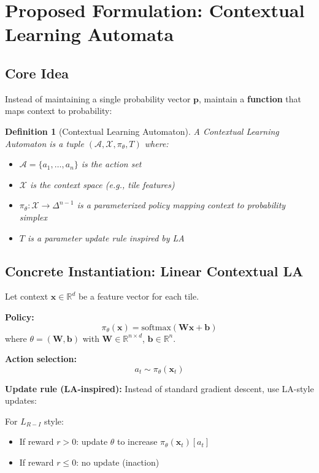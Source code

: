 \documentclass[11pt]{article}
\newtheorem{definition}{Definition}
\begin{document}
\section{Proposed Formulation: Contextual Learning Automata}

\subsection{Core Idea}

Instead of maintaining a single probability vector $\mathbf{p}$, maintain a \textbf{function} that maps context to probability:

\begin{definition}[Contextual Learning Automaton]
A Contextual Learning Automaton is a tuple $(\mathcal{A}, \mathcal{X}, \pi_\theta, T)$ where:
\begin{itemize}
  \item $\mathcal{A} = \{a_1, \ldots, a_n\}$ is the action set
  \item $\mathcal{X}$ is the context space (e.g., tile features)
  \item $\pi_\theta: \mathcal{X} \to \Delta^{n-1}$ is a parameterized policy mapping context to probability simplex
  \item $T$ is a parameter update rule inspired by LA
\end{itemize}
\end{definition}

\subsection{Concrete Instantiation: Linear Contextual LA}

Let context $\mathbf{x} \in \mathbb{R}^d$ be a feature vector for each tile.

\textbf{Policy:}
\[
\pi_\theta(\mathbf{x}) = \text{softmax}(\mathbf{W}\mathbf{x} + \mathbf{b})
\]
where $\theta = (\mathbf{W}, \mathbf{b})$ with $\mathbf{W} \in \mathbb{R}^{n \times d}$, $\mathbf{b} \in \mathbb{R}^n$.

\textbf{Action selection:}
\[
a_t \sim \pi_\theta(\mathbf{x}_t)
\]

\textbf{Update rule (LA-inspired):}
Instead of standard gradient descent, use LA-style updates:

For $L_{R-I}$ style:
\begin{itemize}
  \item If reward $r > 0$: update $\theta$ to increase $\pi_\theta(\mathbf{x}_t)[a_t]$
  \item If reward $r \leq 0$: no update (inaction)
\end{itemize}
\end{document}
